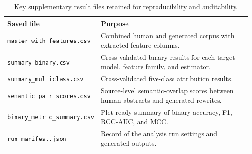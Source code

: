 \documentclass[12pt,a4paper]{article}
\begin{document}
\begin{table}[H]
\centering
\small
\begin{tabularx}{\textwidth}{lX}
\toprule
Saved file & Purpose \\
\midrule
\texttt{master\_with\_features.csv} & Combined human and generated corpus with extracted feature columns. \\
\texttt{summary\_binary.csv} & Cross-validated binary results for each target model, feature family, and estimator. \\
\texttt{summary\_multiclass.csv} & Cross-validated five-class attribution results. \\
\texttt{semantic\_pair\_scores.csv} & Source-level semantic-overlap scores between human abstracts and generated rewrites. \\
\texttt{binary\_metric\_summary.csv} & Plot-ready summary of binary accuracy, F1, ROC-AUC, and MCC. \\
\texttt{run\_manifest.json} & Record of the analysis run settings and generated outputs. \\
\bottomrule
\end{tabularx}
\caption{Key supplementary result files retained for reproducibility and auditability.}
\label{tab:appendix-output-files}
\end{table}
\end{document}
